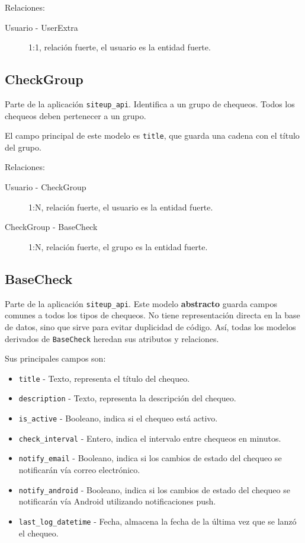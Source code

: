 Relaciones:

\begin{description}
\item[Usuario - UserExtra] 1:1, relación fuerte, el usuario es la entidad fuerte.
\end{description}


\subsection{CheckGroup}

Parte de la aplicación \texttt{siteup\_api}. Identifica a un grupo de
chequeos. Todos los chequeos deben pertenecer a un grupo. 

El campo principal de este modelo es \texttt{title}, que guarda una cadena con
el título del grupo.

Relaciones:

\begin{description}
\item[Usuario - CheckGroup] 1:N, relación fuerte, el usuario es la entidad fuerte.
\item[CheckGroup - BaseCheck] 1:N, relación fuerte, el grupo es la entidad fuerte.
\end{description}

\subsection{BaseCheck}

Parte de la aplicación \texttt{siteup\_api}. Este modelo \textbf{abstracto}
guarda campos comunes a todos los tipos de chequeos. No tiene representación
directa en la base de datos, sino que sirve para evitar duplicidad de
código. Así, todas los modelos derivados de \texttt{BaseCheck} heredan sus
atributos y relaciones.

Sus principales campos son:

\begin{itemize}
\item \texttt{title} - Texto, representa el título del chequeo.
\item \texttt{description} - Texto, representa la descripción del chequeo.
\item \texttt{is\_active} - Booleano, indica si el chequeo está activo.
\item \texttt{check\_interval} - Entero, indica el intervalo entre chequeos en minutos.
\item \texttt{notify\_email} - Booleano, indica si los cambios de estado del
  chequeo se notificarán vía correo electrónico.
\item \texttt{notify\_android} - Booleano, indica si los cambios de estado del
  chequeo se notificarán vía Android utilizando notificaciones push.
\item \texttt{last\_log\_datetime} - Fecha, almacena la fecha de la última vez que se lanzó el chequeo.
\end{itemize}

